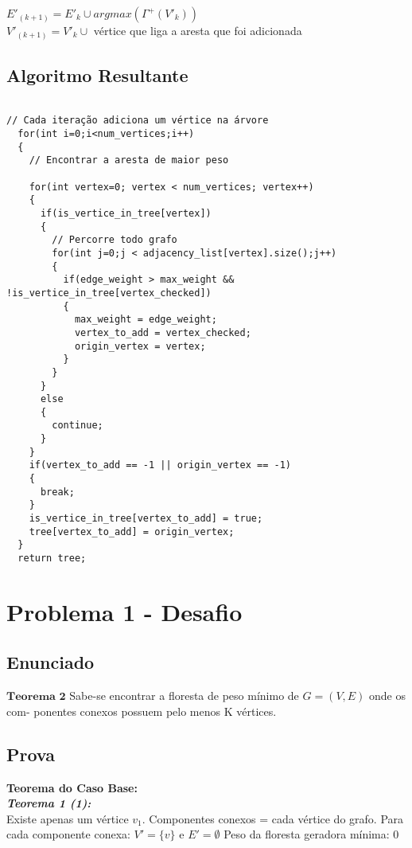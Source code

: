 \documentclass[12pt]{article}
\begin{document}
$E'_{(k+1)} = E'_k \cup {argmax(\Gamma^+(V'_k))}$\\
$V'_{(k+1)} = V'_k \cup$ vértice que liga a aresta que foi adicionada\\

\subsection{ Algoritmo Resultante }
\begin{lstlisting}

// Cada iteração adiciona um vértice na árvore
  for(int i=0;i<num_vertices;i++)
  {
    // Encontrar a aresta de maior peso

    for(int vertex=0; vertex < num_vertices; vertex++)
    {
      if(is_vertice_in_tree[vertex])
      {
        // Percorre todo grafo
        for(int j=0;j < adjacency_list[vertex].size();j++)
        {
          if(edge_weight > max_weight && !is_vertice_in_tree[vertex_checked])
          {
            max_weight = edge_weight;
            vertex_to_add = vertex_checked;
            origin_vertex = vertex;
          }
        }
      }
      else
      {
        continue;
      }
    }
    if(vertex_to_add == -1 || origin_vertex == -1)
    {
      break;
    }
    is_vertice_in_tree[vertex_to_add] = true;
    tree[vertex_to_add] = origin_vertex;
  }
  return tree;
\end{lstlisting}


\section{Problema 1 - Desafio}

\subsection{ Enunciado }
\indent $\mathbf{Teorema}$ $\mathbf{2}$ Sabe-se encontrar a floresta de peso mínimo de $G = (V, E)$ onde os com-
ponentes conexos possuem pelo menos K vértices.


\subsection{ Prova }

\textbf{Teorema do Caso Base:}\\

\textit{\textbf{Teorema 1 (1):}}\\
Existe apenas um vértice $v_1$.
Componentes conexos = cada vértice do grafo.
Para cada componente conexa: $V'=\{v\}$ e $E' = \emptyset$
Peso da floresta geradora mínima: 0\\
\end{document}

